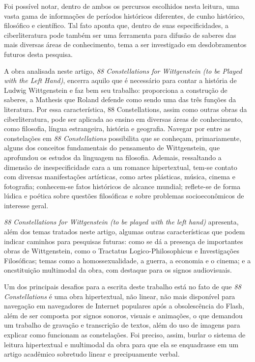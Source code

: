 \documentclass[portuguese]{textolivre}
\begin{document}
Foi possível notar, dentro de ambos os percursos escolhidos nesta leitura, uma vasta gama de informações de períodos históricos diferentes, de cunho histórico, filosófico e científico. Tal fato aponta que, dentro de suas especificidades, a ciberliteratura pode também ser uma ferramenta para difusão de saberes das mais diversas áreas de conhecimento, tema a ser investigado em desdobramentos futuros desta pesquisa. 

A obra analisada neste artigo, \emph{88 Constellations for Wittgenstein (to be Played with the Left Hand)}, encerra aquilo que é necessário para contar a história de Ludwig Wittgenstein e faz bem seu trabalho: proporciona a construção de saberes, a Mathesis que Roland \textcite{barthes2004} defende como sendo uma das três funções da literatura. Por essa característica, 88 Constellations, assim como outras obras da ciberliteratura, pode ser aplicada ao ensino em diversas áreas de conhecimento, como filosofia, língua estrangeira, história e geografia. Navegar por entre as constelações em \emph{88 Constellations} possibilita que se conheçam, primariamente, alguns dos conceitos fundamentais do pensamento de Wittgenstein, que aprofundou os estudos da linguagem na filosofia. Ademais, ressaltando a dimensão de inespecificidade \cite{garramuno2009} cara a um romance hipertextual, tem-se contato com diversas manifestações artísticas, como artes plásticas, música, cinema e fotografia; conhecem-se fatos históricos de alcance mundial; reflete-se de forma lúdica e poética sobre questões filosóficas e sobre problemas socioeconômicos de interesse geral. 

\emph{88 Constellations for Wittgenstein (to be played with the left hand)} apresenta, além dos temas tratados neste artigo, algumas outras características que podem indicar caminhos para pesquisas futuras: como se dá a presença de importantes obras de Wittgenstein, como o Tractatus Logico-Philosophicus e Investigações Filosóficas; temas como a homossexualidade, a guerra, a economia e o cinema; e a oncstituição multimodal da obra, com destaque para os signos audiovisuais. 

Um dos principais desafios para a escrita deste trabalho está no fato de que \emph{88 Constellations} é uma obra hipertextual, não linear, não mais disponível para navegação em navegadores de Internet populares após a obsolescência do Flash, além de ser composta por signos sonoros, visuais e animações, o que demandou um trabalho de gravação e transcrição de textos, além do uso de imagens para explicar como funcionam as constelações. Foi preciso, assim, burlar o sistema de leitura hipertextual e multimodal da obra para que ela se enquadrasse em um artigo acadêmico sobretudo linear e precipuamente verbal.
\end{document}
